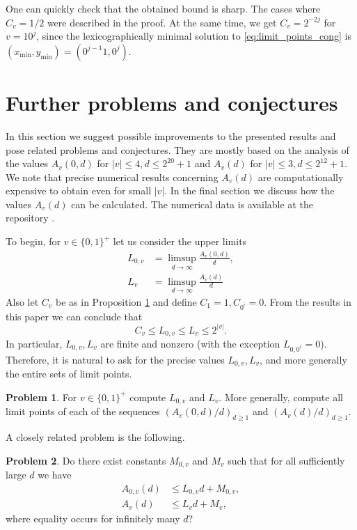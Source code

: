 \documentclass[a4paper,11pt]{amsart}
\theoremstyle{definition}
\newtheorem{prob}{Problem}
\begin{document}
One can quickly check that the obtained bound is sharp. The cases where $C_v = 1/2$ were described in the proof. At the same time, we get $C_v = 2^{-2j}$ for $v=10^j$, since the lexicographically minimal solution to \eqref{eq:limit_points_cong} is $(x_{\min},y_{\min}) = (0^{j-1}1,0^j)$.


\section{Further problems and conjectures} \label{sec:problems}



In this section we suggest possible improvements to the presented results and pose related problems and conjectures. They are mostly based on the analysis of the values $A_v(0,d)$ for $|v| \leq 4, d \leq 2^{20}+1$ and $A_v(d)$ for $|v| \leq 3, d \leq 2^{12}+1$. We note that precise numerical results concerning $A_v(d)$ are computationally expensive to obtain even for small $|v|$. In the final section we discuss how the values $A_{v}(d)$ can be calculated. 
The numerical data is available at the repository \cite{Git}.

To begin, for $v \in \{0,1\}^+$ let us consider the upper limits
\begin{align*}
L_{0,v} &= \limsup_{d \to \infty} \frac{A_v(0,d)}{d}, \\
L_v &= \limsup_{d \to \infty} \frac{A_v(d)}{d}
\end{align*}
Also let $C_v$ be as in Proposition \ref{prob:limit_points} and define $C_1 = 1, C_{0^i} = 0$. From the results in this paper we can conclude that 
 $$ C_v \leq L_{0,v} \leq L_v \leq 2^{|v|}.$$
 In particular, $L_{0,v}, L_v$ are finite and nonzero (with the exception $L_{0,0^i} = 0$).
Therefore, it is natural to ask for the precise values $L_{0,v}, L_v$, and more generally the entire sets of limit points.


\begin{prob} \label{prob:limit_points}
For $v\in\{0,1\}^+$ compute $L_{0,v}$ and $L_v$. More generally, compute all limit points of each of the sequences $(A_v(0,d)/d)_{d \geq 1}$ and $(A_v(d)/d)_{d \geq 1}$.
\end{prob}

A closely related problem is the following.

\begin{prob} \label{prob:upper_bound}
Do there exist constants $M_{0,v}$ and $M_v$ such that for all sufficiently large $d$ we have
\begin{align*}
A_{0,v}(d) &\leq L_{0,v} d + M_{0,v}, \\
A_{v}(d) &\leq L_{v} d + M_{v},
\end{align*}
where equality occurs for infinitely many $d$?
\end{prob}
\end{document}
